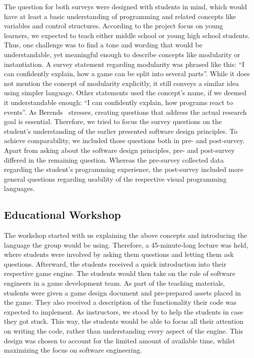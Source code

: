 The question for both surveys were designed with students in mind, which would have at least a basic understanding of programming and related concepts like variables and control structures.
According to the project focus on young learners, we expected to teach either middle school or young high school students.
Thus, one challenge was to find a tone and wording that would be understandable, yet meaningful enough to describe concepts like modularity or instantiation.
A survey statement regarding modularity was phrased like this: “I can confidently explain, how a game can be split into several parts”.
While it does not mention the concept of modularity explicitly, it still conveys a similar idea using simpler language.
Other statements used the concept's name, if we deemed it understandable enough: “I can confidently explain, how programs react to events”.
As Berends~\cite{berends_survey_2006} stresses, creating questions that address the actual research goal is essential.
Therefore, we tried to focus the survey questions on the student's understanding of the earlier presented software design principles.
To achieve comparability, we included those questions both in pre- and post-survey.
Apart from asking about the software design principles, pre- and post-survey differed in the remaining question.
Whereas the pre-survey collected data regarding the student's programming experience, the post-survey included more general questions regarding usability of the respective visual programming languages.

\subsection{Educational Workshop}\label{subsec:educational-workshop}
The workshop started with us explaining the above concepts and introducing the language the group would be using.
Therefore, a 45-minute-long lecture was held, where students were involved by asking them questions and letting them ask questions.
Afterward, the students received a quick introduction into their respective game engine.
The students would then take on the role of software engineers in a game development team.
As part of the teaching materials, students were given a game design document and pre-prepared assets placed in the game.
They also received a description of the functionality their code was expected to implement.
As instructors, we stood by to help the students in case they got stuck.
This way, the students would be able to focus all their attention on writing the code, rather than understanding every aspect of the engine.
This design was chosen to account for the limited amount of available time, whilst maximizing the focus on software engineering.

